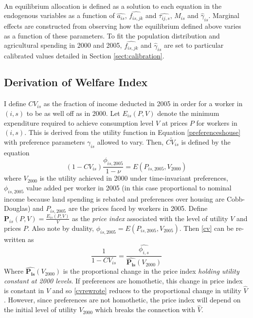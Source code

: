 \documentclass[]{article}
\theoremstyle{plain}
\begin{document}
\paragraph*{}
An equilibrium allocation is defined as a solution to each equation in the endogenous variables as a function of $\hat{a_{is}}$, $\hat{f_{is,jk}}$ and $\hat{\tau_{ij, s}}$, $M_{is}$ and $\hat{\gamma}_{is}$. Marginal effects are constructed from observing how the equilibrium defined above varies as a function of these parameters. To fit the population distribution and agricultural spending in 2000 and 2005, $\hat{f_{is,jk}}$ and $\hat{\gamma}_{is}$ are set to particular calibrated values detailed in Section \ref{sect:calibration}. 

\subsection*{Derivation of Welfare Index}
\paragraph*{}
I define $CV_{is}$ as the fraction of income deducted in 2005 in order for a worker in $(i,s)$ to be as well off as in 2000. Let $E_{is}(P, V)$ denote the minimum expenditure required to achieve consumption level $V$ at prices $P$ for workers in $(i, s)$. This is derived from the utility function in Equation \eqref{preferenceshouse} with preference parameters $\gamma_{is}$ allowed to vary. Then, $\tilde{CV_{is}}$ is defined by the equation
\begin{equation}\label{cv}
	(1-CV_{is})\frac{\phi_{is, 2005}}{1-\nu} = E(P_{is, 2005}, V_{2000})
\end{equation}
where $V_{2000}$ is the utility achieved in 2000 under time-invariant preferences, $\phi_{is, 2005}$ value added per worker in 2005 (in this case proportional to nominal income because land spending is rebated and preferences over housing are Cobb-Douglas) and $P_{is, 2005}$ are the prices faced by workers in 2005. Define $\mathbf{P}_{is}(P, V) = \frac{E_{is}(P, V)}{V}$ as the \textit{price index} associated with the level of utility $V$ and prices $P$. Also note by duality, $\phi_{is, 2005} = E(P_{is, 2005}, V_{2005})$. Then \eqref{cv} can be re-written as
\begin{equation}\label{cvrewrote}
		\frac{1}{1-CV_{is}} = \frac{\hat{\phi_{i, s}}}{\hat{\mathbf{P_{is}}}(V_{2000})}
\end{equation}
Where $\hat{\mathbf{P_{is}}}(V_{2000})$ is the proportional change in the price index \textit{holding utility constant at 2000 levels}. If preferences are homothetic, this change in price index is constant in $V$ and so \eqref{cvrewrote} reduces to the proportional change in utility $\hat{V}$ \citep{samswamy}. However, since preferences are not homothetic, the price index will depend on the initial level of utility $V_{2000}$ which breaks the connection with $\hat{V}$. 
\end{document}
